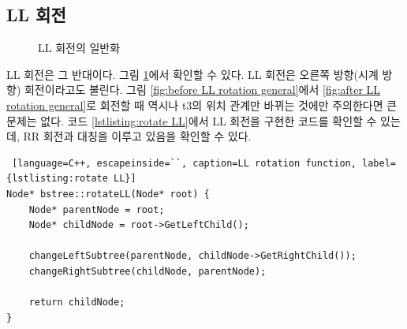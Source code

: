 \documentclass{article}
\begin{document}
\subsection{LL 회전}
\begin{figure}
    \centering
    \caption{LL 회전의 일반화}
    \label{fig:LL rotation general}
\end{figure}
LL 회전은 그 반대이다. 그림 \ref{fig:LL rotation general}에서 확인할 수 있다. LL 회전은 오른쪽 방향(시계 방향) 회전이라고도 불린다. 그림 \ref{fig:before LL rotation general}에서 \ref{fig:after LL rotation general}로 회전할 때 역시나 t3의 위치 관계만 바뀌는 것에만 주의한다면 큰 문제는 없다. 코드 \ref{lstlisting:rotate LL}에서 LL 회전을 구현한 코드를 확인할 수 있는데, RR 회전과 대칭을 이루고 있음을 확인할 수 있다.
\begin{lstlisting} [language=C++, escapeinside=``, caption=LL rotation function, label={lstlisting:rotate LL}]
Node* bstree::rotateLL(Node* root) {
	Node* parentNode = root;
	Node* childNode = root->GetLeftChild();

	changeLeftSubtree(parentNode, childNode->GetRightChild());
	changeRightSubtree(childNode, parentNode);

	return childNode;
}
\end{lstlisting}
\end{document}
